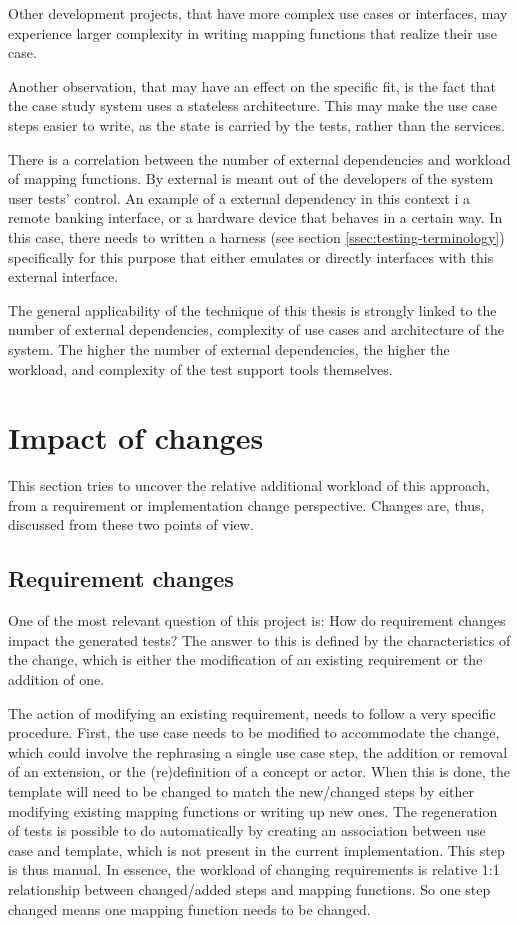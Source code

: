\noindent Other development projects, that have more complex use cases or interfaces, may experience larger complexity in writing mapping functions that realize their use case.\medskip

\noindent Another observation, that may have an effect on the specific fit, is the fact that the case study system uses a stateless architecture. This may make the use case steps easier to write, as the state is carried by the tests, rather than the services.\medskip

\noindent There is a correlation between the number of external dependencies and workload of mapping functions. By external is meant out of the developers of the system user tests' control. An example of a external dependency in this context i a remote banking interface, or a hardware device that behaves in a certain way. In this case, there needs to written a harness (see section \ref{ssec:testing-terminology}) specifically for this purpose that either emulates or directly interfaces with this external interface.\bigskip

\noindent The general applicability of the technique of this thesis is strongly linked to the number of external dependencies, complexity of use cases and architecture of the system. The higher the number of external dependencies, the higher the workload, and complexity of the test support tools themselves.

\section{Impact of changes}
This section tries to uncover the relative additional workload of this approach, from a requirement or implementation change perspective. Changes are, thus, discussed from these two points of view.

\subsection{Requirement changes}
One of the most relevant question of this project is: How do requirement changes impact the generated tests? The answer to this is defined by the characteristics of the change, which is either the modification of an existing requirement or the addition of one.\medskip

\noindent The action of modifying an existing requirement, needs to follow a very specific procedure. First, the use case needs to be modified to accommodate the change, which could involve the rephrasing a single use case step, the addition or removal of an extension, or the (re)definition of a concept or actor. When this is done, the template will need to be changed to match the new/changed steps by either modifying existing mapping functions or writing up new ones. The regeneration of tests is possible to do automatically by creating an association between use case and template, which is not present in the current implementation. This step is thus manual. In essence, the workload of changing requirements is relative 1:1 relationship between changed/added steps and mapping functions. So one step changed means one mapping function needs to be changed.\medskip

